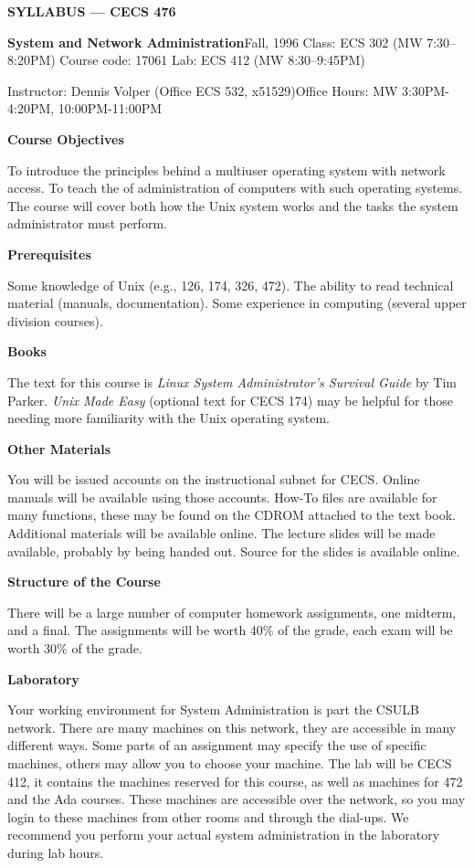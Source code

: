 \centerline{{\bf SYLLABUS --- CECS 476}}
\vskip 6pt
{\obeylines\parindent 0pt
{\bf System and Network Administration}\hfill Fall, 1996
Class: ECS 302 (MW 7:30--8:20PM) \hfill Course code: 17061 \hfill Lab: ECS 412 (MW 8:30--9:45PM)

Instructor: Dennis Volper (Office ECS 532, x51529)\hfill Office Hours: MW 3:30PM-4:20PM, 10:00PM-11:00PM

}
 
\vskip 6pt
\centerline{\bf Course Objectives}
 
To introduce the principles behind a multiuser operating system with network
access.
To teach the of administration of computers with such operating systems.
The course will cover both how the Unix system works
and the tasks the system administrator must perform.

\vskip 6pt
\centerline{\bf Prerequisites }

Some knowledge of Unix (e.g., 126, 174, 326, 472).
The ability to read technical material (manuals, documentation).
Some experience in computing (several upper division courses).
 
\vskip 6pt
\centerline{\bf Books }
 
The text for this course is 
{\it Linux System Administrator's Survival Guide}
by Tim Parker.
{\it Unix Made Easy} (optional text for CECS 174) may be helpful
for those needing more familiarity with the Unix operating system.

\vskip 6pt
\centerline{\bf Other Materials}

You will be issued accounts on the instructional subnet for CECS.
Online manuals will be available using those accounts.
How-To files are available for many functions, 
these may be found on the CDROM attached to the text book.
Additional materials will be available online.
The lecture slides will be made available, probably by being handed out.
Source for the slides is available online.

\vskip 6pt
\centerline{\bf Structure of the Course}
 
There will be a large number of computer homework assignments, 
one midterm, and a final.
The assignments will be worth 40\% of the grade,
each exam will be worth 30\% of the grade.
     
\vskip 6pt
\centerline{\bf Laboratory}

Your working environment for System Administration is part the CSULB network.
There are many machines on this network, they are accessible in
many different ways.
Some parts of an assignment may specify the use of specific machines, others
may allow you to choose your machine.
The lab will be CECS 412, it contains the machines reserved for this course,
as well as machines for 472 and the Ada courses.
These machines are accessible over the network,
so you may login to these machines from other rooms
and through the dial-ups.
We recommend you perform your actual system administration in the laboratory
during lab hours.

